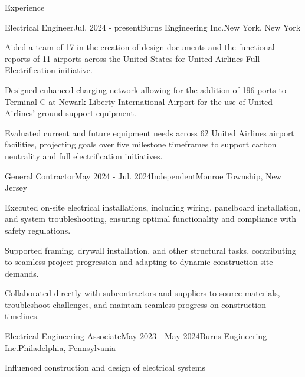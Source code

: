 \documentclass{resume}
\begin{document}

    \begin{rSection}{Experience}
        \begin{rSubsection}{Electrical Engineer}{Jul. 2024 - present}{Burns Engineering Inc.}{New York, New York}
            \item Aided a team of 17 in the creation of design documents
                and the functional reports of 11 airports across the United
                States for United Airlines Full Electrification initiative.
            \item Designed enhanced charging network allowing for the addition
                of 196 ports to Terminal C at Newark Liberty International
                Airport for the use of United Airlines' ground support equipment.
            \item Evaluated current and future equipment needs across 62 United
                Airlines airport facilities, projecting goals over five
                milestone timeframes to support carbon neutrality and full
                electrification initiatives.
        \end{rSubsection}
        \begin{rSubsection}{General Contractor}{May 2024 - Jul. 2024}{Independent}{Monroe Township, New Jersey}
            \item Executed on-site electrical installations, including wiring,
                panelboard installation, and system troubleshooting, ensuring
                optimal functionality and compliance with safety regulations.
            \item Supported framing, drywall installation, and other structural
                tasks, contributing to seamless project progression and
                adapting to dynamic construction site demands.
            \item Collaborated directly with subcontractors and suppliers to
                source materials, troubleshoot challenges, and maintain
                seamless progress on construction timelines.
        \end{rSubsection}
        \begin{rSubsection}{Electrical Engineering Associate}{May 2023 - May 2024}{Burns Engineering Inc.}{Philadelphia, Pennsylvania}
            \item Influenced construction and design of electrical systems

\end{rSubsection}
\end{rSection}
\end{document}
